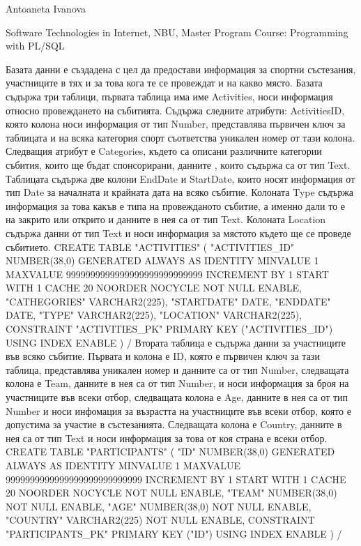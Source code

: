 
Antoaneta Ivanova

Software Technologies in Internet, NBU, Master Program
Course: Programming with PL/SQL


Базата данни е създадена с цел да предостави информация за спортни състезания, участниците в тях и за това кога те се провеждат и на какво място. 
Базата съдържа три таблици, първата таблица има име Activities, носи информация относно провеждането на събитията. Съдържа следните атрибути: ActivitiesID, която колона носи информация от тип Number, представлява първичен ключ за таблицата и на всяка категория спорт съответства уникален номер от тази колона. Следващия атрибут е Categories, където са описани различните категории събития, които ще бъдат спонсорирани, данните , които съдържа са от тип Text. Таблицата съдържа две колони EndDate и StartDate, които носят информация от тип Date за началната и крайната дата на всяко събитие. Колоната Type съдържа информация за това какъв е типа на провежданото събитие, а именно дали то е на закрито или открито и данните в нея са от тип Text. Колоната Location съдържа данни от тип Text и носи информация за мястото където ще се проведе събитието. 
CREATE TABLE  "ACTIVITIES" 
   (	"ACTIVITIES_ID" NUMBER(38,0) GENERATED ALWAYS AS IDENTITY MINVALUE 1 MAXVALUE 9999999999999999999999999999 INCREMENT BY 1 START WITH 1 CACHE 20 NOORDER  NOCYCLE  NOT NULL ENABLE, 
	"CATHEGORIES" VARCHAR2(225), 
	"STARTDATE" DATE, 
	"ENDDATE" DATE, 
	"TYPE" VARCHAR2(225), 
	"LOCATION" VARCHAR2(225), 
	 CONSTRAINT "ACTIVITIES_PK" PRIMARY KEY ("ACTIVITIES_ID")
  USING INDEX  ENABLE
   )
/
Втората таблица е съдържа данни за участниците във всяко събитие. Първата и колона е ID, която е първичен ключ за тази таблица, представлява уникален номер и данните са от тип Number, следващата колона е Team, данните в нея са от тип Number, и носи информация за броя на участниците във всеки отбор, следващата колона е Age, данните в нея са от тип Number и носи инфомация за възрастта на участниците във всеки отбор, която е допустима за участие в състезанията. Следващата колона е  Country, данните в нея са от тип Text и носи информация за това от коя страна е всеки отбор. 
CREATE TABLE  "PARTICIPANTS" 
   (	"ID" NUMBER(38,0) GENERATED ALWAYS AS IDENTITY MINVALUE 1 MAXVALUE 9999999999999999999999999999 INCREMENT BY 1 START WITH 1 CACHE 20 NOORDER  NOCYCLE  NOT NULL ENABLE, 
	"TEAM" NUMBER(38,0) NOT NULL ENABLE, 
	"AGE" NUMBER(38,0) NOT NULL ENABLE, 
	"COUNTRY" VARCHAR2(225) NOT NULL ENABLE, 
	 CONSTRAINT "PARTICIPANTS_PK" PRIMARY KEY ("ID")
  USING INDEX  ENABLE
   )
/

